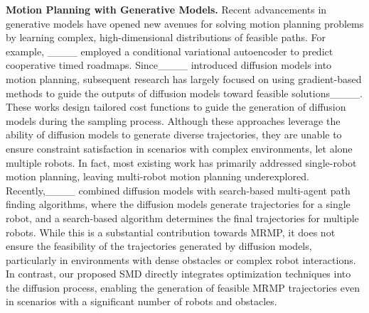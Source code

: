 \textbf{Motion Planning with Generative Models.}
Recent advancements in generative models have opened new avenues for solving motion planning problems by learning complex, high-dimensional distributions of feasible paths. For example, ____ employed a conditional variational autoencoder to predict cooperative timed roadmaps. Since____ introduced diffusion models into motion planning, subsequent research has largely focused on using gradient-based methods to guide the outputs of diffusion models toward feasible solutions____. These works design tailored cost functions to guide the generation of diffusion models during the sampling process. Although these approaches leverage the ability of diffusion models to generate diverse trajectories, they are unable to ensure constraint satisfaction in scenarios with complex environments, let alone multiple robots. 
In fact, most existing work has primarily addressed single-robot motion planning, leaving multi-robot motion planning underexplored. Recently,____ combined diffusion models with search-based multi-agent path finding algorithms, where the diffusion models generate trajectories for a single robot, and a search-based algorithm determines the final trajectories for multiple robots. While this is a substantial contribution towards MRMP, it does not ensure the feasibility of the trajectories generated by diffusion models, particularly in environments with dense obstacles or complex robot interactions. 
In contrast, our proposed SMD directly integrates optimization techniques into the diffusion process, enabling the generation of feasible MRMP trajectories even in scenarios with a significant number of robots and obstacles.